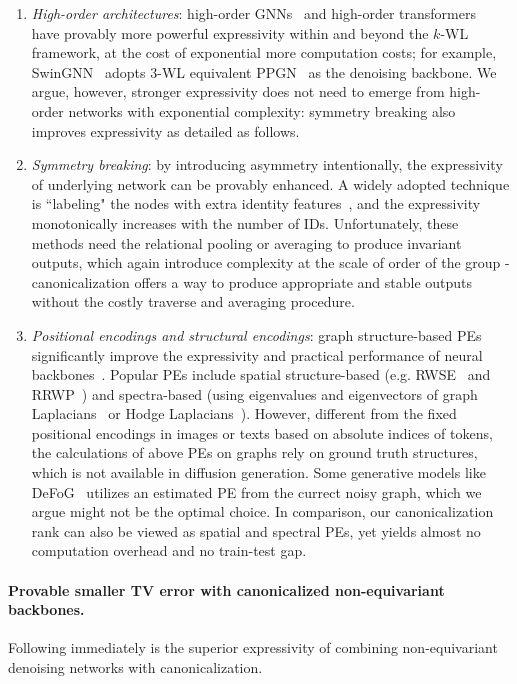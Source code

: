 \documentclass{article}
\theoremstyle{plain}
\theoremstyle{definition}
\theoremstyle{remark}
\newcommand{\1}{\mathbf{1}}
\begin{document}
\begin{enumerate}
    \item \emph{High-order architectures}: high-order GNNs~\citep{morris2019weisfeiler,morris2020weisfeiler,PPGN} and high-order transformers~\citep{Kim2023pure,zhou2024KTransformer} have provably more powerful expressivity within and beyond the $k$-WL framework, at the cost of exponential more computation costs; for example, SwinGNN~\citep{yan2023swingnn} adopts $3$-WL equivalent PPGN~\citep{PPGN} as the denoising backbone. We argue, however, stronger expressivity does not need to emerge from high-order networks with exponential complexity: symmetry breaking also improves expressivity as detailed as follows.
    \item \emph{Symmetry breaking}: by introducing asymmetry intentionally, the expressivity of underlying network can be provably enhanced. A widely adopted technique is ``labeling" the nodes with extra identity features~\citep{IDAwareGNN,zhang2021labeling,I2GNN,klWL}, and the expressivity monotonically increases with the number of IDs. Unfortunately, these methods need the relational pooling or averaging to produce invariant outputs, which again introduce complexity at the scale of order of the group - canonicalization offers a way to produce appropriate and stable outputs~\citep{RethinkingGraphCanon} without the costly traverse and averaging procedure.
    \item \emph{Positional encodings and structural encodings}: graph structure-based PEs significantly improve the expressivity and practical performance of neural backbones~\citep{GPS}. Popular PEs include spatial structure-based (e.g. RWSE~\citep{RWSELearnable} and RRWP~\citep{Exphormer}) and spectra-based (using eigenvalues and eigenvectors of graph Laplacians~\citep{LaplacianCanonization,SignBasisNet,Specformer} or Hodge Laplacians~\citep{zhou2023hodge}). However, different from the fixed positional encodings in images or texts based on absolute indices of tokens, the calculations of above PEs on graphs rely on ground truth structures, which is not available in diffusion generation. Some generative models like DeFoG~\citep{qin2024defog} utilizes an estimated PE from the currect noisy graph, which we argue might not be the optimal choice. In comparison, our canonicalization rank can also be viewed as spatial and spectral PEs, yet yields almost no computation overhead and no train-test gap.
\end{enumerate}

\paragraph{Provable smaller TV error with canonicalized non-equivariant backbones.}
Following immediately is the superior expressivity of combining non-equivariant denoising networks with canonicalization.
\end{document}
